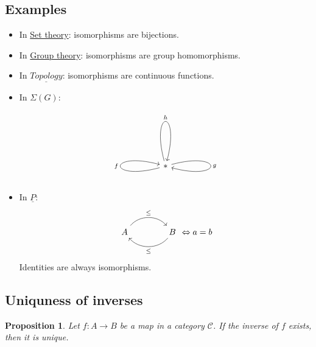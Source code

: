 \documentclass{article}
\newtheorem{proposition}{Proposition}[section]
\begin{document}
    \subsection{Examples}

    \begin{itemize}
        \item In \underline{Set theory}: isomorphisms are bijections.
        \item In \underline{Group theory}: isomorphisms are group homomorphisms.
        \item In $\underline{Topology}$: isomorphisms are continuous functions.
        \item In $\Sigma(G)$:
        \[
            \begin{tikzcd}[scale=4.5]
                * \arrow[loop left, "f"] \arrow[loop right, "g"] \arrow[loop above, "h"]
            \end{tikzcd}
        \]
        \item In $\underline{P}$:
        \[
            \begin{tikzcd}[column sep=4em, row sep=4em]
                A \arrow[r, bend left=50, "\leq"]
                & B \arrow[l, bend left=50, "\leq"]
            \end{tikzcd} \Leftrightarrow a = b
        \]
        Identities are always isomorphisms.
    \end{itemize}

    \subsection{Uniquness of inverses}

    \begin{proposition}
        Let $f: A \to B$ be a map in a category $\mathcal{C}$. If the inverse of $f$ exists, then it is unique.
    \end{proposition}
\end{document}
